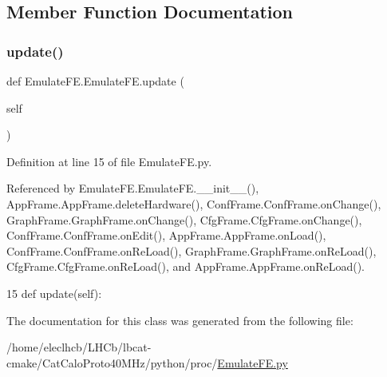 \subsection{Member Function Documentation}
\mbox{\label{classEmulateFE_1_1EmulateFE_aefc7339cfc727ad13e3307761ff72795}} 
\subsubsection{\texorpdfstring{update()}{update()}}
{\footnotesize\ttfamily def Emulate\+F\+E.\+Emulate\+F\+E.\+update (\begin{DoxyParamCaption}\item[{}]{self }\end{DoxyParamCaption})}



Definition at line 15 of file Emulate\+F\+E.\+py.



Referenced by Emulate\+F\+E.\+Emulate\+F\+E.\+\_\+\+\_\+init\+\_\+\+\_\+(), App\+Frame.\+App\+Frame.\+delete\+Hardware(), Conf\+Frame.\+Conf\+Frame.\+on\+Change(), Graph\+Frame.\+Graph\+Frame.\+on\+Change(), Cfg\+Frame.\+Cfg\+Frame.\+on\+Change(), Conf\+Frame.\+Conf\+Frame.\+on\+Edit(), App\+Frame.\+App\+Frame.\+on\+Load(), Conf\+Frame.\+Conf\+Frame.\+on\+Re\+Load(), Graph\+Frame.\+Graph\+Frame.\+on\+Re\+Load(), Cfg\+Frame.\+Cfg\+Frame.\+on\+Re\+Load(), and App\+Frame.\+App\+Frame.\+on\+Re\+Load().


\begin{DoxyCode}
15     \textcolor{keyword}{def }update(self):
\end{DoxyCode}


The documentation for this class was generated from the following file\+:\begin{DoxyCompactItemize}
\item 
/home/eleclhcb/\+L\+H\+Cb/lbcat-\/cmake/\+Cat\+Calo\+Proto40\+M\+Hz/python/proc/\hyperlink{EmulateFE_8py}{Emulate\+F\+E.\+py}\end{DoxyCompactItemize}
